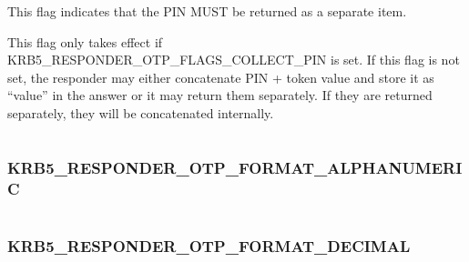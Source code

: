 \documentclass[letterpaper,10pt,english]{sphinxmanual}
\begin{document}
\begin{fulllineitems}
\label{appdev/refs/macros/KRB5_RESPONDER_OTP_FLAGS_SEPARATE_PIN:KRB5_RESPONDER_OTP_FLAGS_SEPARATE_PIN}
\end{fulllineitems}


This flag indicates that the PIN MUST be returned as a separate item.

This flag only takes effect if KRB5\_RESPONDER\_OTP\_FLAGS\_COLLECT\_PIN is set. If this flag is not set, the responder may either concatenate PIN + token value and store it as ``value'' in the answer or it may return them separately. If they are returned separately, they will be concatenated internally.

\begin{tabulary}{\linewidth}{|L|L|}
\hline

 & 
\\\hline
\end{tabulary}



\subsubsection{KRB5\_RESPONDER\_OTP\_FORMAT\_ALPHANUMERIC}
\label{appdev/refs/macros/KRB5_RESPONDER_OTP_FORMAT_ALPHANUMERIC:krb5-responder-otp-format-alphanumeric-data}\label{appdev/refs/macros/KRB5_RESPONDER_OTP_FORMAT_ALPHANUMERIC:krb5-responder-otp-format-alphanumeric}\label{appdev/refs/macros/KRB5_RESPONDER_OTP_FORMAT_ALPHANUMERIC::doc}

\begin{fulllineitems}
\label{appdev/refs/macros/KRB5_RESPONDER_OTP_FORMAT_ALPHANUMERIC:KRB5_RESPONDER_OTP_FORMAT_ALPHANUMERIC}
\end{fulllineitems}


\begin{tabulary}{\linewidth}{|L|L|}
\hline

 & 
\\\hline
\end{tabulary}



\subsubsection{KRB5\_RESPONDER\_OTP\_FORMAT\_DECIMAL}
\label{appdev/refs/macros/KRB5_RESPONDER_OTP_FORMAT_DECIMAL:krb5-responder-otp-format-decimal-data}\label{appdev/refs/macros/KRB5_RESPONDER_OTP_FORMAT_DECIMAL::doc}\label{appdev/refs/macros/KRB5_RESPONDER_OTP_FORMAT_DECIMAL:krb5-responder-otp-format-decimal}
\end{document}
